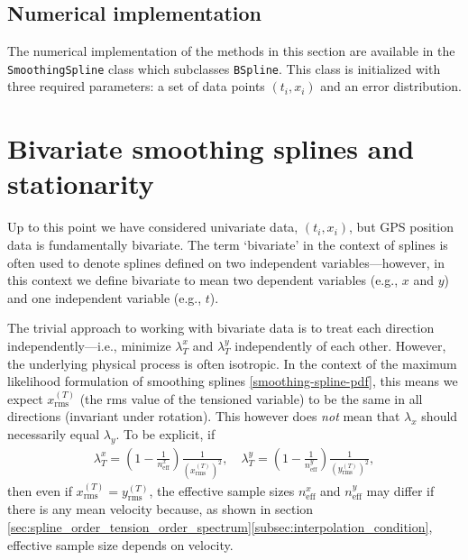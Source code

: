 \documentclass{ametsoc}
\begin{document}

\subsection{Numerical implementation}

The numerical implementation of the methods in this section are available in the \texttt{SmoothingSpline} class which subclasses \texttt{BSpline}. This class is initialized with three required parameters: a set of data points $(t_i,x_i)$ and an error distribution.

\section{Bivariate smoothing splines and stationarity}
\label{sec:bivariate}

Up to this point we have considered univariate data, $(t_i, x_i)$, but GPS position data is fundamentally bivariate. The term `bivariate' in the context of splines is often used to denote splines defined on two independent variables---however, in this context we define bivariate to mean two dependent variables (e.g., $x$ and $y$) and one independent variable (e.g., $t$).

The trivial approach to working with bivariate data is to treat each direction independently---i.e., minimize $\lambda^x_T$ and $\lambda^y_T$ independently of each other. However, the underlying physical process is often isotropic. In the context of the maximum likelihood formulation of smoothing splines \eqref{smoothing-spline-pdf}, this means we expect $x^{(T)}_{\textrm{rms}}$ (the rms value of the tensioned variable) to be the same in all directions (invariant under rotation). This however does \emph{not} mean that $\lambda_x$ should necessarily equal $\lambda_y$. To be explicit, if 
\begin{equation}
\label{lambda_x}
\begin{split}
\lambda^x_T = \left( 1 - \frac{1}{n^x_{\textrm{eff}}} \right) \frac{1}{ \left(x^{(T)}_{\textrm{rms}}\right)^2}, \quad
\lambda^y_T = \left( 1 - \frac{1}{n^y_{\textrm{eff}}} \right) \frac{1}{ \left(y^{(T)}_{\textrm{rms}}\right)^2},
\end{split}
\end{equation}
then even if $x^{(T)}_{\textrm{rms}} = y^{(T)}_{\textrm{rms}}$, the effective sample sizes $n^x_{\textrm{eff}}$ and $n^y_{\textrm{eff}}$ may differ if there is any mean velocity because, as shown in section \ref{sec:spline_order_tension_order_spectrum}\ref{subsec:interpolation_condition}, effective sample size depends on velocity.
\end{document}
